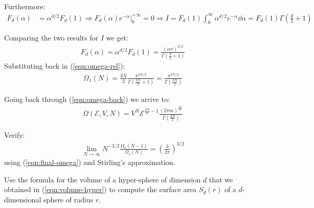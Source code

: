\documentclass[../template.tex]{subfiles}
\begin{document}
Furthermore:
\begin{align*}
    F_d(\alpha) &= \alpha^{d/2} F_d(1) \Rightarrow F_d(\alpha) e^{-\alpha} \Big|_{0}^{+\infty} = 0 \Rightarrow I= F_d(1) \int_0^{\infty} \alpha^{d/2} e^{-\alpha} \dd{\alpha} = F_d(1) \Gamma\left(\frac{d}{2} +1 \right)
\end{align*}

Comparing the two results for $I$ we get:
\begin{align} \label{eqn:volume-hyper}
    F_d(\alpha) = \alpha^{d/2} F_d(1) = \frac{(\alpha \pi)^{d/2}}{\Gamma\left(\frac{d}{2}+1 \right)}
\end{align}
Substituting back in (\ref{eqn:omega-rel}):
\begin{align*}
    \Omega_1(N) = \frac{3N}{2} \frac{\pi^{3N/2}}{\Gamma\left(\frac{3N}{2}+1 \right)}  = \frac{\pi^{3N/2}}{\Gamma\left(\frac{3N}{2} \right)} 
\end{align*}

Going back through (\ref{eqn:omega-back}) we arrive to:
\begin{align}\label{eqn:final-omega}
    \Omega(\mathcal{E}, V, N) =  V^N \mathcal{E}^{\frac{3N}{2} -1 } \frac{(2 \pi m)^{\frac{3N}{2} }}{\Gamma\left(\frac{3N}{2} \right)} 
\end{align}

\begin{exo}[Verifications]
    Verify:
    \begin{align*}
        \lim_{N \to \infty} N^{-3/2} \frac{\Omega_1(N-1)}{\Omega_1(N)}  = \left(\frac{3}{2 \pi} \right)^{3/2}
    \end{align*}
    using (\ref{eqn:final-omega}) and Stirling's approximation.
\end{exo}

\begin{exo}
    Use the formula for the volume of a hyper-sphere of dimension $d$ that we obtained in (\ref{eqn:volume-hyper}) to compute the surface area $S_d(r)$ of a $d$-dimensional sphere of radius $r$.
\end{exo}
\end{document}
